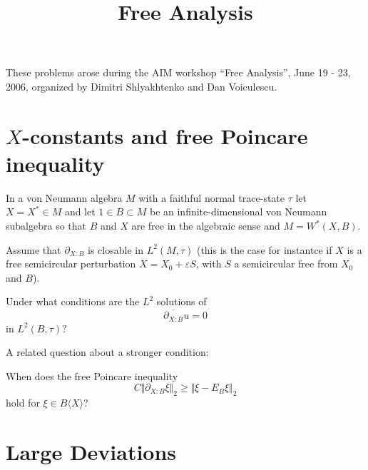 \documentclass[12pt,letterpaper, reqno]{amsart}
\begin{document}
\title{Free Analysis}

\maketitle

These problems arose during the AIM workshop ``Free Analysis'',
 June 19 - 23, 2006, organized by Dimitri Shlyakhtenko and Dan Voiculescu.

\section{ $X$-constants and free Poincare inequality }

\begin{problemblock}

 In a von Neumann algebra $M$
with a faithful normal trace-state $\tau$ let $X=X^{*}\in M$ and
let $1\in B\subset M$ be an infinite-dimensional von Neumann subalgebra
so that $B$ and $X$ are free in the algebraic sense and $M=W^{*}(X,B)$. 

Assume that $\partial_{X:B}$ is closable in $L^{2}(M,\tau)$ (this
is the case for instantce if $X$ is a free semicircular perturbation
$X=X_{0}+\varepsilon S$, with $S$ a semicircular free from $X_{0}$
and $B$). 

\begin{problem}
Under what conditions are the $L^{2}$ solutions of \[
\overline{\partial_{X:B}}u=0\]
in $L^{2}(B,\tau)?$ 
\end{problem}
\end{problemblock}

\begin{problemblock}

A related question about a stronger condition:

\begin{problem}
When does the free
Poincare inequality\[
C\Vert\partial_{X:B}\xi\Vert_{2}\geq\Vert\xi-E_{B}\xi\Vert_{2}\]
hold for $\xi\in B\langle X\rangle$?
\end{problem}

\end{problemblock}







\section{Large Deviations}
\end{document}
